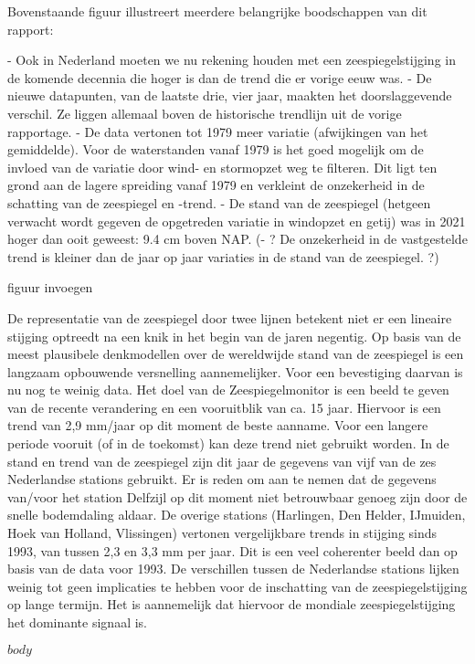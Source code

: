 \documentclass[biblatex,ddraft]{deltares_report}
\begin{document}
{Bovenstaande figuur illustreert meerdere belangrijke boodschappen van dit rapport:

-   Ook in Nederland moeten we nu rekening houden met een zeespiegelstijging in de komende decennia die hoger is dan de trend die er vorige eeuw was.
-   De nieuwe datapunten, van de laatste drie, vier jaar, maakten het doorslaggevende verschil. Ze liggen allemaal boven de historische trendlijn uit de vorige rapportage.
-   De data vertonen tot 1979 meer variatie (afwijkingen van het gemiddelde). Voor de waterstanden vanaf 1979 is het goed mogelijk om de invloed van de variatie door wind- en stormopzet weg te filteren. Dit ligt ten grond aan de lagere spreiding vanaf 1979 en verkleint de onzekerheid in de schatting van de zeespiegel en -trend.
-	De stand van de zeespiegel (hetgeen verwacht wordt gegeven de opgetreden variatie in windopzet en getij) was in 2021 hoger dan ooit geweest: 9.4 cm boven NAP.
(- ? De onzekerheid in de vastgestelde trend is kleiner dan de jaar op jaar variaties in de stand van de zeespiegel. ?)

figuur invoegen

De representatie van de zeespiegel door twee lijnen betekent niet er een lineaire stijging optreedt na een knik in het begin van de jaren negentig. Op basis van de meest plausibele denkmodellen over de wereldwijde stand van de zeespiegel is een langzaam opbouwende versnelling aannemelijker. Voor een bevestiging daarvan is nu nog te weinig data. Het doel van de Zeespiegelmonitor is een beeld te geven van de recente verandering en een vooruitblik van ca. 15 jaar. Hiervoor is een trend van 2,9 mm/jaar op dit moment de beste aanname. Voor een langere periode vooruit (of in de toekomst) kan deze trend niet gebruikt worden. In de stand en trend van de zeespiegel zijn dit jaar de gegevens van vijf van de zes Nederlandse stations gebruikt. Er is reden om aan te nemen dat de gegevens van/voor het station Delfzijl op dit moment niet betrouwbaar genoeg zijn door de snelle bodemdaling aldaar. De overige stations (Harlingen, Den Helder, IJmuiden, Hoek van Holland, Vlissingen) vertonen vergelijkbare trends in stijging sinds 1993, van tussen 2,3 en 3,3 mm per jaar. Dit is een veel coherenter beeld dan op basis van de data voor 1993. De verschillen tussen de Nederlandse stations lijken weinig tot geen implicaties te hebben voor de inschatting van de zeespiegelstijging op lange termijn. Het is aannemelijk dat hiervoor de mondiale zeespiegelstijging het dominante signaal is.

}
\deltarestitle


$body$

\end{document}

